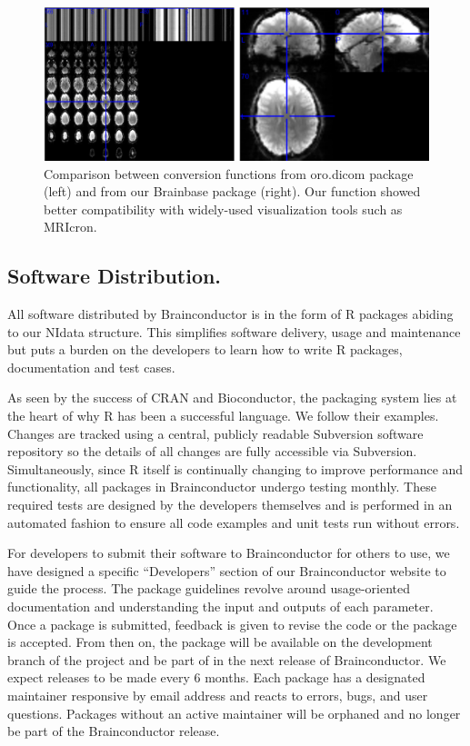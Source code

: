 \documentclass{nature}
\begin{document}
\begin{figure}[tb]
\centering
\includegraphics[width=400pt]{fig/brainconductor/dicom.png}

\caption{Comparison between conversion functions from oro.dicom package (left)
and from our Brainbase  package (right).  Our function showed better
compatibility  with widely-used visualization tools such as MRIcron.}
\label{fig:dicom}
\end{figure}

\subsection{Software Distribution.}

All software distributed by Brainconductor is in the form of R packages abiding
to our NIdata structure. This
simplifies software delivery, usage and maintenance but puts a burden on the
developers
to learn how to write R packages, documentation and test cases.

As seen by the success of CRAN and Bioconductor, the packaging system lies
at the heart of why R has been a successful language. We follow their examples.
Changes are tracked using a central, publicly readable Subversion software
repository
so the details of all changes are fully accessible via Subversion.
Simultaneously, since
R itself is continually changing to improve performance and functionality, all
packages
in Brainconductor undergo testing monthly. These required tests are designed by
the
developers themselves and is performed in an automated fashion to ensure
all code examples and unit tests run without errors.

For developers to submit their software to Brainconductor for others to use,
we have designed a specific ``Developers'' section of our Brainconductor website
to guide the process. The package guidelines revolve around usage-oriented
documentation and understanding the input and outputs of each parameter.
 Once
a package is submitted, feedback is given to revise the code or the package is
accepted.
From then on, the package will be available on the
development branch of the project and be part of in the next release of
Brainconductor.
We expect releases to be made every 6 months.
Each package has a designated maintainer responsive by email address and reacts
to
errors, bugs, and user questions. Packages without an active maintainer will be
orphaned and no longer be part of the Brainconductor release.
\end{document}
